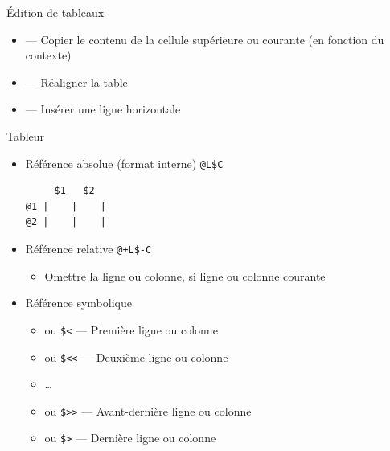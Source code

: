 \documentclass[presentation,t]{beamer}
\let\ORIkeys\keys
\renewcommand{\keys}[1]{\ORIkeys{\texttt{#1}}}
\begin{document}
\begin{frame}[label={sec:org2ce958e}]{Édition de tableaux}
\begin{itemize}
\item \keys{S-RET} --- Copier le contenu de la cellule supérieure ou courante (en
fonction du contexte)
\item \keys{C-c C-c} --- Réaligner la table
\item \keys{C-c -} --- Insérer une ligne horizontale
\end{itemize}
\end{frame}

\begin{frame}[fragile,label={sec:orge3f9ffa}]{Tableur}
 \begin{itemize}
\item Référence absolue (format interne) \texttt{@L\$C}

\lstset{language=org,label= ,caption= ,captionpos=b,numbers=none}
\begin{lstlisting}
     $1   $2
@1 |    |    |
@2 |    |    |
\end{lstlisting}

\item Référence relative \texttt{@+L\$-C}
\begin{itemize}
\item Omettre la ligne ou colonne, si ligne ou colonne \alert{courante}
\end{itemize}

\item Référence symbolique
\begin{itemize}
\item \keys{@<} ou \texttt{\$<} --- Première ligne ou colonne
\item \keys{@<<} ou \texttt{\$<<} --- Deuxième ligne ou colonne
\item \ldots{}
\item \keys{@>>} ou \texttt{\$>>} --- Avant-dernière ligne ou colonne
\item \keys{@>} ou \texttt{\$>} --- Dernière ligne ou colonne
\end{itemize}
\end{itemize}
\end{frame}
\end{document}
